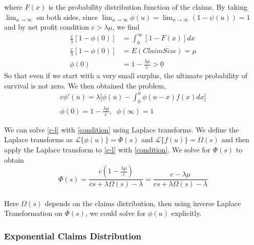 \documentclass[12pt]{article}
\begin{document}
where $F(x)$ is the probability distribution function of the claims.
By taking $\displaystyle\lim_{u\to \infty}$ on both sides, since $\displaystyle\lim_{u\to \infty}\phi(u)=\lim_{u\to \infty}(1-\psi(u))=1$ and by net profit condition \(c>\lambda\mu\), we find \\
\begin{align*}
    \frac{c}{\lambda}[1-\phi(0)]&=\int_{0}^{\infty}[1-F(x)]dx\\
    \frac{c}{\lambda}[1-\phi(0)]&=E(Claim Size)=\mu\\
    \phi(0)&=1-\frac{\lambda\mu}{c}>0
\end{align*}
So that even if we start with a very small surplus, the ultimate probability
of survival is not zero.
We then obtained the problem,
\begin{eqnarray}
\displaystyle c\phi'(u)=\lambda\Big[\phi(u)-\int_{0}^{u}\phi(u-x)f(x)dx\Big]
\label{c-l} \\
\displaystyle \phi(0)=1-\frac{\lambda\mu}{c}, \;\; \phi(\infty)=1
\label{condition}
\end{eqnarray} 

We can solve \eqref{c-l} with \eqref{condition} using Laplace transforms.  We
define the Laplace transforms as
 \(\mathcal{L}\{\phi(u)\}=\Phi(s)\) and \(\mathcal{L}\{f(u)\}=\Omega(s)\)
 and then apply the Laplace transform to \eqref{c-l} with \eqref{condition}.
We solve for $\Phi(s)$ to obtain
\begin{equation}\label{Lap-Tr}
    \Phi(s)=\frac{c(1-\frac{\lambda\mu}{c})}{cs+\lambda\Omega(s)-\lambda}=\frac{c-\lambda\mu}{cs+\lambda\Omega(s)-\lambda}
\end{equation}
\\
Here \(\Omega(s)\) depends on the claims distribution, then using inverse Laplace Transformation on \(\Phi(s)\), we could solve for \(\phi(u)\) explicitly.


\subsubsection{Exponential Claims Distribution}
\end{document}
